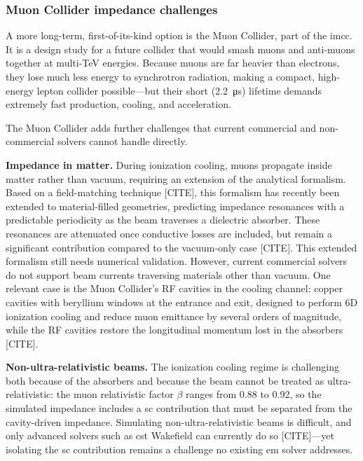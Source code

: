 \subsubsection{Muon Collider impedance challenges}

A more long-term, first-of-its-kind option is the Muon Collider, part of the \gls{imcc}. It is a design study for a future collider that would smash muons and anti-muons together at multi-TeV energies. Because muons are far heavier than electrons, they lose much less energy to synchrotron radiation, making a compact, high-energy lepton collider possible---but their short (\SI{2.2}{\micro\second}) lifetime demands extremely fast production, cooling, and acceleration.

The Muon Collider adds further challenges that current commercial and non-commercial solvers cannot handle directly.

\begin{description}
\item \textbf{Impedance in matter.} During ionization cooling, muons propagate inside matter rather than vacuum, requiring an extension of
the analytical formalism. Based on a field-matching technique [CITE], this formalism has recently been extended to material-filled geometries, predicting impedance resonances with a predictable periodicity as the beam traverses a dielectric absorber. These resonances are attenuated once conductive losses are included, but remain a significant contribution compared to the vacuum-only case [CITE]. This extended formalism still needs numerical validation. However, current commercial solvers do not support beam currents traversing materials other than vacuum. One relevant case is the Muon Collider's RF cavities in the cooling channel: copper cavities with beryllium windows at the entrance and exit, designed to perform 6D ionization cooling and reduce muon emittance by several orders of magnitude, while the RF cavities restore the longitudinal momentum lost in the absorbers [CITE].

\item \textbf{Non-ultra-relativistic beams.} The ionization cooling regime is challenging both because of the absorbers and because the
beam cannot be treated as ultra-relativistic: the muon relativistic factor $\beta$ ranges from 0.88 to 0.92, so the simulated impedance includes a \gls{sc} contribution that must be separated from the cavity-driven impedance. Simulating non-ultra-relativistic beams is difficult, and only advanced solvers such as \gls{cst} Wakefield can currently do so [CITE]---yet isolating the \gls{sc} contribution remains a challenge no existing \gls{em} solver addresses.
\end{description}
